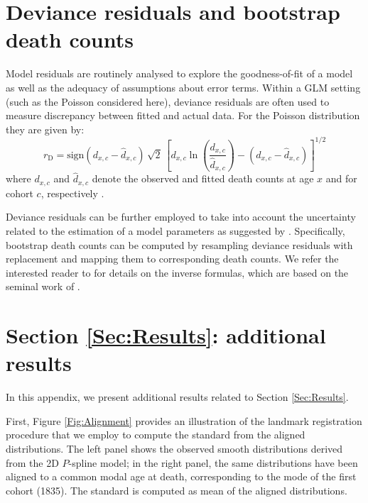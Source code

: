 \documentclass[11pt, a4paper]{article}
\begin{document}
\bigskip


 

\bigskip
\appendix
{}

\section{Deviance residuals and bootstrap death counts}
\label{Appendix:ResidualDeath}     
Model residuals are routinely analysed to explore the goodness-of-fit of a model as well as the adequacy of assumptions about error terms. Within a GLM setting (such as the Poisson considered here), deviance residuals are often used to measure discrepancy between fitted and actual data. For the Poisson distribution they are given by: 
\begin{equation}\label{Eq:DevRes}
r_{\mathrm{D}}= \mathrm{sign} (d_{x,c}-\hat{d}_{x,c}) \, \sqrt{2} \, 
\left[d_{x,c} \ln \left(\frac{d_{x,c}}{\hat{d}_{x,c}}\right) - 
\left(d_{x,c}-\hat{d}_{x,c}\right)
\right]^{1/2}
\end{equation}
where $d_{x,c}$ and $\hat{d}_{x,c}$ denote the observed and fitted death counts at age $x$ and for cohort $c$, respectively \citep{mccullagh1989glm}. 

Deviance residuals can be further employed to take into account the uncertainty related to the estimation of a model parameters as suggested by \cite{koissi2006evaluating}. Specifically, bootstrap death counts can be computed by resampling deviance residuals with replacement and mapping them to corresponding death counts. We refer the interested reader to \cite{renshaw2008simulation} for details on the inverse formulas, which are based on the seminal work of \cite{efron1994introduction}.  

\section{Section \ref{Sec:Results}: additional results}
\label{Appendix:AdditResults}     

In this appendix, we present additional results related to Section \ref{Sec:Results}. 

{\color{red}
First, Figure \ref{Fig:Alignment} provides an illustration of the landmark registration procedure that we employ to compute the standard from the aligned distributions. The left panel shows the observed smooth distributions derived from the 2D $P$-spline model; in the right panel, the same distributions have been aligned to a common modal age at death, corresponding to the mode of the first cohort (1835). The standard is computed as mean of the aligned distributions. \par
}
\end{document}
